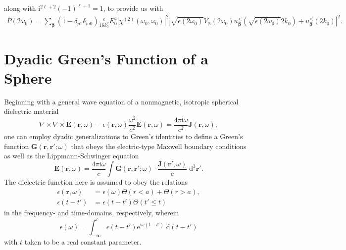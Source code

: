 \documentclass{article}
\begin{document}
along with $\mathrm{i}^{2\ell + 2}(-1)^{\ell + 1} = 1$, to provide us with
\begin{equation}
\begin{split}
\bar{P}(2\omega_0) = \sum_{\bm{\beta}}(1 - \delta_{p1}\delta_{m0})\frac{c}{16k_0^2}E_0^4\left|\chi^{(2)}(\omega_0,\omega_0)\right|^2\left|\sqrt{\epsilon(2\omega_0)}V_{\bm{\beta}}(2\omega_0)u_{\bm{\beta}}^<\!\left(\sqrt{\epsilon(2\omega_0)}2k_0\right) + u_{\bm{\beta}}^<(2k_0)\right|^2.
\end{split}
\end{equation}

















\newpage
\appendix
{}





\section{Dyadic Green's Function of a Sphere}

Beginning with a general wave equation of a nonmagnetic, isotropic spherical dielectric material
\begin{equation}
\nabla\times\nabla\times\mathbf{E}(\mathbf{r},\omega) - \epsilon(\mathbf{r},\omega)\frac{\omega^2}{c^2}\mathbf{E}(\mathbf{r},\omega) = \frac{4\pi\mathrm{i}\omega}{c^2}\mathbf{J}(\mathbf{r},\omega),
\end{equation}
one can employ dyadic generalizations to Green's identities to define a Green's function $\mathbf{G}(\mathbf{r},\mathbf{r}';\omega)$ that obeys the electric-type Maxwell boundary conditions as well as the Lippmann-Schwinger equation
\begin{equation}
\mathbf{E}(\mathbf{r},\omega) = \frac{4\pi\mathrm{i}\omega}{c}\int\mathbf{G}(\mathbf{r},\mathbf{r}';\omega)\cdot\frac{\mathbf{J}(\mathbf{r}',\omega)}{c}\;\mathrm{d}^3\mathbf{r}'.
\end{equation}
The dielectric function here is assumed to obey the relations
\begin{equation}
\begin{split}
\epsilon(\mathbf{r},\omega) &= \epsilon(\omega)\Theta(r < a) + \Theta(r > a),\\
\epsilon(t - t') &= \epsilon(t - t')\Theta(t' \leq t)
\end{split}
\end{equation}
in the frequency- and time-domains, respectively, wherein
\begin{equation}
\epsilon(\omega) = \int_{-\infty}^t \epsilon(t - t')\mathrm{e}^{\mathrm{i}\omega(t - t')}\;\mathrm{d}(t-t')
\end{equation}
with $t$ taken to be a real constant parameter. 
\end{document}
